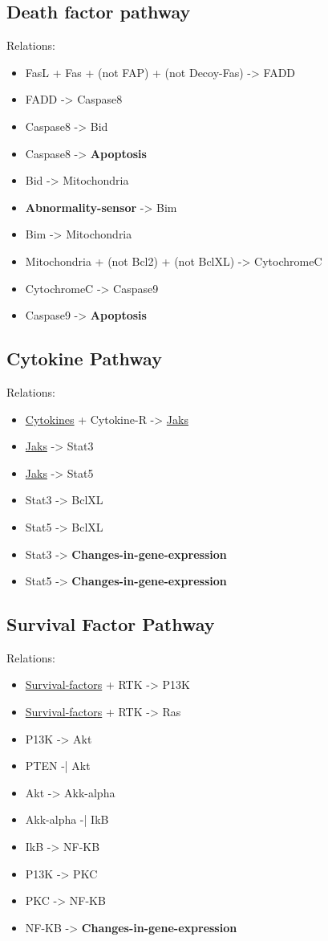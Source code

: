 \documentclass[11pt]{article}
\begin{document}
\subsection{Death factor pathway}
\label{sec-2-4}
Relations:
\begin{itemize}
\item FasL + Fas + (not FAP) + (not Decoy-Fas) -> FADD
\item FADD -> Caspase8
\item Caspase8 -> Bid
\item Caspase8 -> \textbf{Apoptosis}
\item Bid -> Mitochondria
\item \textbf{Abnormality-sensor} -> Bim
\item Bim -> Mitochondria
\item Mitochondria + (not Bcl2) + (not BclXL) -> CytochromeC
\item CytochromeC -> Caspase9
\item Caspase9 -> \textbf{Apoptosis}
\end{itemize}
\subsection{Cytokine Pathway}
\label{sec-2-5}
Relations:
\begin{itemize}
\item \uline{Cytokines} + Cytokine-R -> \uline{Jaks}
\item \uline{Jaks} -> Stat3
\item \uline{Jaks} -> Stat5
\item Stat3 -> BclXL
\item Stat5 -> BclXL
\item Stat3 -> \textbf{Changes-in-gene-expression}
\item Stat5 -> \textbf{Changes-in-gene-expression}
\end{itemize}
\subsection{Survival Factor Pathway}
\label{sec-2-6}
Relations:
\begin{itemize}
\item \uline{Survival-factors} + RTK -> P13K
\item \uline{Survival-factors} + RTK -> Ras
\item P13K -> Akt
\item PTEN -| Akt
\item Akt -> Akk-alpha
\item Akk-alpha -| IkB
\item IkB -> NF-KB
\item P13K -> PKC
\item PKC -> NF-KB
\item NF-KB -> \textbf{Changes-in-gene-expression}
\end{itemize}
\end{document}

